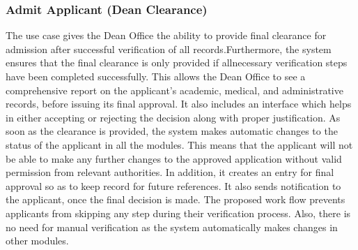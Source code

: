 \subsubsection{Admit Applicant (Dean Clearance)}

The use case gives the Dean Office the ability to provide final clearance for admission after successful verification of all records.Furthermore, the system ensures that the final clearance is only provided if allnecessary verification steps have been completed successfully. This allows the Dean Office to see a comprehensive report on the applicant’s academic, medical, and administrative records, before issuing its final approval. It also includes an interface which helps in either accepting or rejecting the decision along with proper justification. As soon as the clearance is provided, the system makes automatic changes to the status of the applicant in all the modules. This means that the applicant will not be able to make any further changes to the approved application without valid permission from relevant authorities. In addition, it creates an entry for final approval so as to keep record for future references. It also sends notification to the applicant, once the final decision is made. The proposed work flow prevents applicants from skipping any step during their verification process. Also, there is no need for manual verification as the system automatically makes changes in other modules.
